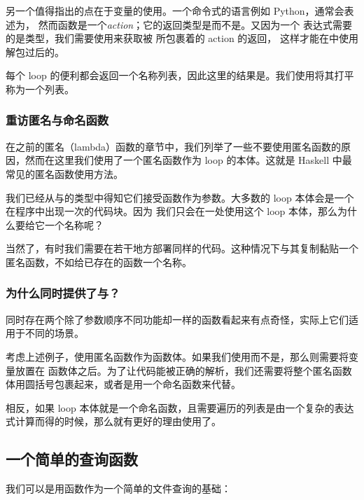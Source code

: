 \documentclass[./main.tex]{subfiles}
\begin{document}
另一个值得指出的点在于变量的使用。一个命令式的语言例如 Python，通常会表述为，
然而函数是一个\textit{action}；它的返回类型是而不是。又因为一个
表达式需要的是类型，我们需要使用\acode{<-}来获取被  所包裹着的 action 的返回，
这样才能在中使用解包过后的。

每个 loop 的便利都会返回一个名称列表，因此这里的结果是。我们使用将其打平
称为一个列表。

\subsubsection*{重访匿名与命名函数}

在之前的匿名（lambda）函数的章节中，我们列举了一些不要使用匿名函数的原因，然而在这里我们使用了一个匿名函数作为 loop 的本体。这就是
Haskell 中最常见的匿名函数使用方法。

我们已经从与的类型中得知它们接受函数作为参数。大多数的 loop 本体会是一个在程序中出现一次的代码块。因为
我们只会在一处使用这个 loop 本体，那么为什么要给它一个名称呢？

当然了，有时我们需要在若干地方部署同样的代码。这种情况下与其复制黏贴一个匿名函数，不如给已存在的函数一个名称。

\subsubsection*{为什么同时提供了与？}

同时存在两个除了参数顺序不同功能却一样的函数看起来有点奇怪，实际上它们适用于不同的场景。

考虑上述例子，使用匿名函数作为函数体。如果我们使用而不是，那么则需要将变量放置在
函数体之后。为了让代码能被正确的解析，我们还需要将整个匿名函数体用圆括号包裹起来，或者是用一个命名函数来代替。

相反，如果 loop 本体就是一个命名函数，且需要遍历的列表是由一个复杂的表达式计算而得的时候，那么就有更好的理由使用了。

\subsection*{一个简单的查询函数}

我们可以是用函数作为一个简单的文件查询的基础：
\end{document}
